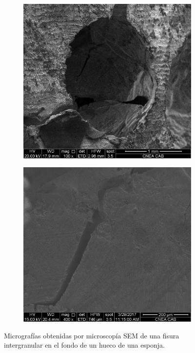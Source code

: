 \documentclass[a4paper,12pt,fleqn,twoside,openany]{book}
\begin{document}
 \begin{figure}[h]
 \centering
    \begin{subfigure}{0.45\textwidth}
        \includegraphics[width=\textwidth]{Img/Introduccion/EsponjaA_004.jpg}
        \caption{}
        \label{fig:}
    \end{subfigure}
    \begin{subfigure}{0.45\textwidth}
        \includegraphics[width=\textwidth]{Img/Introduccion/EsponjaA_005.jpg}
        \caption{}
        \label{fig:EspAa}
    \end{subfigure}
  \caption{Micrografías obtenidas por microscopía SEM de una fisura intergranular en el fondo de un hueco de una esponja.}
  \label{fig:FisuraEsponja}
  \end{figure}
\end{document}
